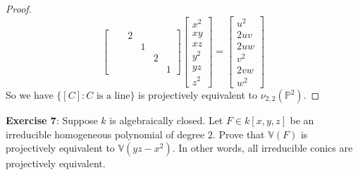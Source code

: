 \documentclass{article}
\begin{document}
\begin{itemize}
\begin{proof}
\begin{equation*}
\begin{bmatrix}
                              &   & 2 &   &   &   \\
                              &   &   & 1 &   &   \\
                              &   &   &   & 2 &   \\
                              &   &   &   &   & 1   
                        \end{bmatrix} \begin{bmatrix}
                            x^{2} \\
                            xy    \\
                            xz    \\
                            y^{2} \\
                            yz    \\
                            z^{2}   
                        \end{bmatrix} = \begin{bmatrix}
                            u^{2} \\
                            2uv   \\
                            2uw   \\
                            v^{2} \\
                            2vw    \\
                            w^{2}   
                        \end{bmatrix}
                    \end{equation*}
                So we have $\{[C] : C \text{ is a line}\}$ is projectively equivalent to $\nu_{2, 2}(\mathbb{P}^{2})$.
            \end{proof}
    \end{itemize}

\newpage

\textbf{Exercise 7}: Suppose $k$ is algebraically closed. Let $F \in k[x, y, z]$ be an irreducible homogeneous polynomial of degree $2$. Prove that $ \mathbb{V}(F)$ is projectively equivalent to $\mathbb{V}(yz - x^{2})$. In other words, all irreducible conics are projectively equivalent. 
\end{document}
